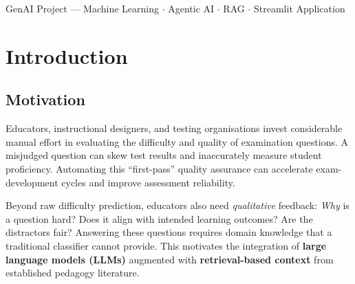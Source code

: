 \documentclass[12pt, a4paper, twoside]{article}
\begin{document}
\begin{titlepage}
\begin{center}

    \vfill
    {\small\textcolor{muted}{GenAI Project — Machine Learning $\cdot$
    Agentic AI $\cdot$ RAG $\cdot$ Streamlit Application}}
\end{center}
\end{titlepage}

\tableofcontents
\newpage

\section{Introduction}\label{sec:intro}

\subsection{Motivation}

Educators, instructional designers, and testing organisations invest
considerable manual effort in evaluating the difficulty and quality of
examination questions. A misjudged question can skew test results and
inaccurately measure student proficiency. Automating this
\enquote{first-pass} quality assurance can accelerate exam-development
cycles and improve assessment reliability.

Beyond raw difficulty prediction, educators also need
\emph{qualitative} feedback: \emph{Why} is a question hard? Does it
align with intended learning outcomes? Are the distractors fair?
Answering these questions requires domain knowledge that a traditional
classifier cannot provide. This motivates the integration of
\textbf{large language models (LLMs)} augmented with
\textbf{retrieval-based context} from established pedagogy literature.
\end{document}
